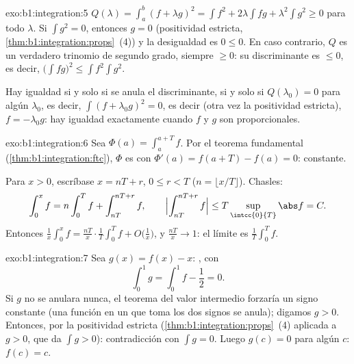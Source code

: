 \begin{solution}{exo:b1:integration:5}
$Q(\lambda) = \int_a^b (f + \lambda g)^2 = \int f^2 + 2\lambda \int
fg + \lambda^2 \int g^2 \geq 0$ para todo $\lambda$. Si
$\int g^2 = 0$, entonces $g = 0$ (positividad estricta,
\cref{thm:b1:integration:props}~(4)) y la desigualdad es
$0 \leq 0$. En caso contrario, $Q$ es un verdadero trinomio de
segundo grado, siempre $\geq 0$: su discriminante es $\leq 0$, es
decir, $\bigl(\int fg\bigr)^2 \leq \int f^2 \int g^2$.

Hay igualdad si y solo si se anula el discriminante, si y solo si
$Q(\lambda_0) = 0$ para algún $\lambda_0$, es decir,
$\int (f + \lambda_0 g)^2 = 0$, es decir (otra vez la positividad
estricta), $f = -\lambda_0 g$: hay igualdad exactamente cuando $f$ y
$g$ son proporcionales.
\end{solution}

\begin{solution}{exo:b1:integration:6}
Sea $\Phi(a) = \int_a^{a+T} f$. Por el teorema fundamental
(\cref{thm:b1:integration:ftc}), $\Phi$ es  con
$\Phi'(a) = f(a + T) - f(a) = 0$: constante.

Para $x > 0$, escríbase $x = nT + r$, $0 \leq r < T$
($n = \lfloor x/T \rfloor$). Chasles:
\[
\int_0^x f = n \int_0^T f + \int_{nT}^{nT + r} f,
\qquad
\Bigl| \int_{nT}^{nT+r} f \Bigr| \leq T \sup_{\intcc{0}{T}} \abs f
= C .
\]
Entonces $\frac 1x \int_0^x f = \frac{nT}{x}\cdot\frac 1T \int_0^T f +
O\bigl(\frac 1x\bigr)$, y $\frac{nT}{x} \to 1$: el límite es
$\frac1T \int_0^T f$.
\end{solution}

\begin{solution}{exo:b1:integration:7}
Sea $g(x) = f(x) - x$: , con
\[
\int_0^1 g = \int_0^1 f - \frac12 = 0 .
\]
Si $g$ no se anulara nunca, el teorema del valor intermedio forzaría
un signo constante (una función  en un  que toma
los dos signos se anula); digamos $g > 0$. Entonces, por la
positividad estricta (\cref{thm:b1:integration:props}~(4) aplicada a
$g > 0$, que da $\int g > 0$): contradicción con $\int g = 0$. Luego
$g(c) = 0$ para algún $c$: $f(c) = c$.
\end{solution}

